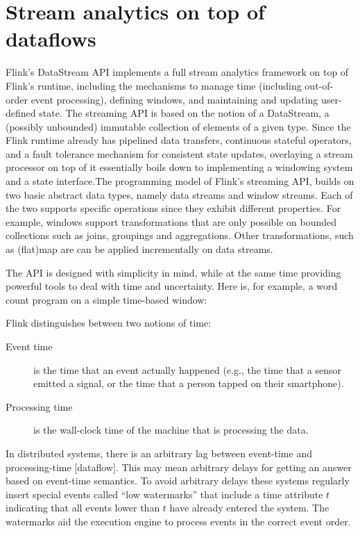 \documentclass{sig-alternate}
\begin{document}


\section{Stream analytics on top of \\ dataflows}

Flink's DataStream API implements a full stream analytics framework on top of Flink's runtime, including the mechanisms to manage time (including out-of-order event processing), defining windows, and maintaining and updating user-defined state. The streaming API is based on the notion of a DataStream, a (possibly unbounded) immutable collection of elements of a given type. Since the Flink runtime already has pipelined data transfers, continuous stateful operators, and a fault tolerance mechanism for consistent state updates, overlaying a stream processor on top of it essentially boils down to implementing a windowing system and a state interface.The programming model of Flink's streaming API,  builds on two basic abstract data types, namely data streams and window streams. Each of the two supports specific operations since they exhibit different properties. For example, windows support transformations that are only possible on bounded collections such as joins, groupings and aggregations. Other transformations, such as (flat)map are  can be applied incrementally on data streams.

The API is designed with simplicity in mind, while at the same time providing powerful tools to deal with time and uncertainty. Here is, for example, a word count program on a simple  time-based window:



Flink distinguishes between two notions of time: 
\begin{description}
\item[Event time] is the time that an event actually happened (e.g., the time that a sensor emitted a signal, or the time that a person tapped on their smartphone).
\item[Processing time] is the wall-clock time of the machine that is processing the data.
\end{description}

In distributed systems, there is an arbitrary lag between event-time and processing-time [dataflow]. This may mean arbitrary delays for getting an answer based on event-time semantics. To avoid arbitrary delays these systems regularly insert special events called ``low watermarks''  that include a time attribute $t$ indicating that all events lower than $t$ have already entered the system. The watermarks aid the execution engine to process events in the correct event order. 
\end{document}
